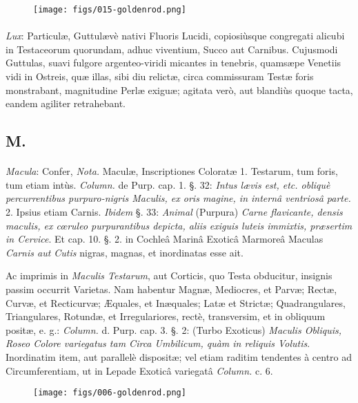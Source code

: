 \documentclass[a4paper, 11pt, oneside, polutonikogreek, german]{article}
\begin{document}
\begin{figure}[H]
\centering
\texttt{[image: figs/015-goldenrod.png]}
\end{figure}
\paragraph{}
\emph{Lux}: Particulæ, Guttulævè nativi Fluoris Lucidi, copiosiùsque congregati alicubi in Testaceorum quorundam, adhuc viventium, Succo aut Carnibus. Cujusmodi Guttulas, suavi fulgore argenteo-viridi micantes in tenebris, quamsæpe Venetiis vidi in Ostreis, quæ illas, sibi diu relictæ, circa commissuram Testæ foris monstrabant, magnitudine Perlæ exiguæ; agitata verò, aut blandiùs quoque tacta, eandem agiliter retrahebant.

\subsection{M.}
\paragraph{}
\emph{Macula}: Confer, \emph{Nota.} Maculæ, Inscriptiones Coloratæ 1. Testarum, tum foris, tum etiam intùs. \emph{Column.} de Purp. cap. 1. §. 32: \emph{Intus lævis est, etc. obliquè percurrentibus purpuro-nigris Maculis, ex oris magine, in internâ ventriosâ parte.} 2. Ipsius etiam Carnis. \emph{Ibidem} §. 33: \emph{Animal} (Purpura) \emph{Carne flavicante, densis maculis, ex cœruleo purpurantibus depicta, aliis exiguis luteis immixtis, præsertim in Cervice}. Et cap. 10. §. 2. in Cochleâ Marinâ Exoticâ Marmoreâ Maculas \emph{Carnis aut Cutis} nigras, magnas, et inordinatas esse ait.

Ac imprimis in \emph{Maculis Testarum}, aut Corticis, quo Testa obducitur, insignis passim occurrit Varietas. Nam habentur Magnæ, Mediocres, et Parvæ; Rectæ, Curvæ, et Recticurvæ; Æquales, et Inæquales; Latæ et Strictæ; Quadrangulares, Triangulares, Rotundæ, et Irregulariores, rectè, transversim, et in obliquum positæ, e. g.: \emph{Column.} d. Purp. cap. 3. §. 2: (Turbo Exoticus) \emph{Maculis Obliquis, Roseo Colore variegatus tam Circa Umbilicum, quàm in reliquis Volutis}. Inordinatim item, aut parallelè dispositæ; vel etiam raditim tendentes à centro ad Circumferentiam, ut in Lepade Exoticâ variegatâ \emph{Column.} c. 6.

\begin{figure}[H]
\centering
\texttt{[image: figs/006-goldenrod.png]}
\end{figure}
\end{document}
